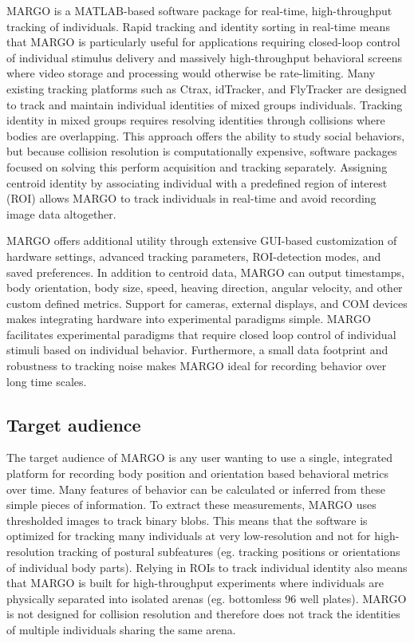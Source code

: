 \documentclass[11pt]{article}
\begin{document}
MARGO is a MATLAB-based software package for real-time, high-throughput tracking of individuals. Rapid tracking and identity sorting in real-time means that MARGO is particularly useful for applications requiring closed-loop control of individual stimulus delivery and massively high-throughput behavioral screens where video storage and processing would otherwise be rate-limiting. Many existing tracking platforms such as Ctrax, idTracker, and FlyTracker are designed to track and maintain individual identities of mixed groups individuals. Tracking identity in mixed groups requires resolving identities through collisions where bodies are overlapping. This approach offers the ability to study social behaviors, but because collision resolution is computationally expensive, software packages focused on solving this perform acquisition and tracking separately. Assigning centroid identity by associating individual with a predefined region of interest (ROI) allows MARGO to track individuals in real-time and avoid recording image data altogether. 

MARGO offers additional utility through extensive GUI-based customization of hardware settings, advanced tracking parameters, ROI-detection modes, and saved preferences. In addition to centroid data, MARGO can output timestamps, body orientation, body size, speed, heaving direction, angular velocity, and other custom defined metrics. Support for cameras, external displays, and COM devices makes integrating hardware into experimental paradigms simple. MARGO facilitates experimental paradigms that require closed loop control of individual stimuli based on individual behavior. Furthermore, a small data footprint and robustness to tracking noise makes MARGO ideal for recording behavior over long time scales.

\subsection{Target audience}

The target audience of MARGO is any user wanting to use a single, integrated platform for recording body position and orientation based behavioral metrics over time. Many features of behavior can be calculated or inferred from these simple pieces of information. To extract these measurements, MARGO uses thresholded images to track binary blobs. This means that the software is optimized for tracking many individuals at very low-resolution and not for high-resolution tracking of postural subfeatures (eg. tracking positions or orientations of individual body parts). Relying in ROIs to track individual identity also means that MARGO is built for high-throughput experiments where individuals are physically separated into isolated arenas (eg. bottomless 96 well plates). MARGO is not designed for collision resolution and therefore does not track the identities of multiple individuals sharing the same arena. 
\end{document}
